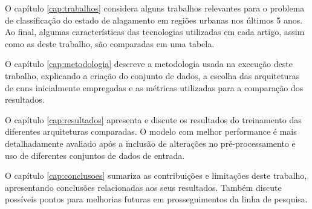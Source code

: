 O capítulo \ref{cap:trabalhos} considera alguns trabalhos relevantes para o problema de classificação do estado de alagamento em regiões urbanas nos últimos 5 anos.
Ao final, algumas características das tecnologias utilizadas em cada artigo, assim como as deste trabalho, são comparadas em uma tabela.

O capítulo \ref{cap:metodologia} descreve a metodologia usada na execução deste trabalho,
explicando a criação do conjunto de dados, a escolha das arquiteturas de \acrshort{cnn}s inicialmente empregadas e as métricas utilizadas para a comparação dos resultados.

O capítulo \ref{cap:resultados} apresenta e discute os resultados do treinamento das diferentes arquiteturas comparadas.
O modelo com melhor performance é mais detalhadamente avaliado após a inclusão de alterações no pré-processamento e uso de diferentes conjuntos de dados de entrada.

O capítulo \ref{cap:conclusoes} sumariza as contribuições e limitações deste trabalho, apresentando conclusões relacionadas aos seus resultados.
Também discute possíveis pontos para melhorias futuras em prosseguimentos da linha de pesquisa.